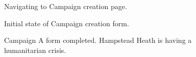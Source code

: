 \documentclass{article}
\begin{document}
		\begin{figure}[ht]
			\centering
			\caption{Navigating to Campaign creation page.}
			\label{fig:eval-ca-1}
		\end{figure}

		\begin{figure}[ht]
			\centering
			\caption{Initial state of Campaign creation form.}
			\label{fig:eval-ca-2}
		\end{figure}

		\begin{figure}[ht]
			\centering
			\caption{Campaign A form completed. Hampstead Heath is having a humanitarian crisis.}
			\label{fig:eval-ca-3}
		\end{figure}
\end{document}
